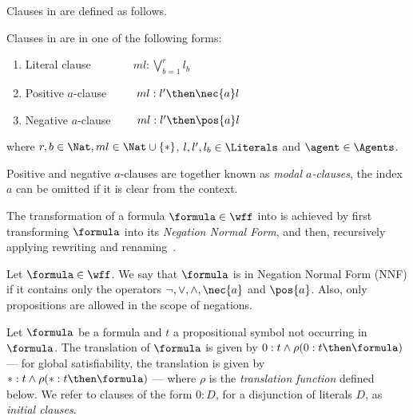 Clauses in  are defined as follows.

\begin{definition}
    Clauses in  are in one of the following forms:
    \begin{enumerate}
        \item Literal clause $\ \ \quad \qquad ml : \bigvee^r_{b=1} l_b$
        \item Positive $a$-clause $\ \qquad ml : l' \then \nec{a} l$
        \item Negative $a$-clause $\qquad ml : l' \then \pos{a} l$
    \end{enumerate}
    where $r, b \in \Nat, ml \in \Nat \cup \{*\}$, $l, l', l_b \in
    \Literals$ and $\agent \in \Agents$.
\end{definition}

Positive and negative $a$-clauses are together known as \emph{modal
$a$-clauses}, the index $a$ can be omitted if it is clear from the context.

The transformation of a formula $\formula \in \wff$ into  is achieved
by first transforming $\formula$ into its \emph{Negation Normal Form}, and then,
recursively applying rewriting and renaming~\cite{plaisted1986structure}.

\begin{definition}
    Let $\formula \in \wff$. We say that $\formula$ is in Negation Normal Form (NNF) if
    it contains only the operators $\neg, \lor, \land, \nec{a}$ and $\pos{a}$. Also,
    only propositions are allowed in the scope of negations.
\end{definition}

Let $\formula$ be a formula and $t$ a propositional symbol not occurring in
$\formula$. The translation of $\formula$ is given by $0 : t \land \rho(0 : t
\then \formula)$ --- for global satisfiability, the translation is given by $* :
t \land \rho(* : t \then \formula)$ --- where $\rho$ is the \emph{translation
function} defined below. We refer to clauses of the form $0 : D$, for a
disjunction of literals $D$, as \emph{initial clauses}. 

